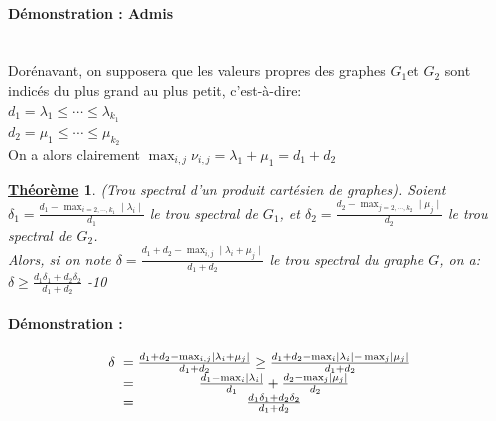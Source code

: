 \documentclass[12pt,openany]{report}
\newtheorem{theorem}{\underline{Théorème}}
\begin{document}
\paragraph{Démonstration : Admis }\cite{Ghazal}\\
Dorénavant, on supposera que les valeurs propres des graphes $\mathit{G}_1  $et $\mathit{G}_2  $ sont indicés du plus grand au plus petit, c'est-à-dire:\\
$d_1=\lambda_1 \leq \cdots \leq \lambda_{k_1} $\\
$d_2=\mu_1 \leq \cdots \leq \mu_{k_2}   $\\
On a alors clairement $ \max_{i,j}\nu_{i,j}=\lambda_1 + \mu_1=d_1+d_2  $
\begin{theorem} (Trou spectral d’un produit cartésien de graphes). Soient $\delta_1=\frac{d_{1}-\max_{i=2,\cdots, k_1}\mid \lambda_i \mid}{d_1}$ le trou spectral de $ \mathit{G}_1 $, et $\delta_2 =\frac{d_{2}-\max_{j=2,\cdots, k_2}\mid \mu_j \mid}{d_2} $ le trou spectral de $ \mathit{G}_2$.\\
Alors, si on note $ \delta =\frac{d_{1}+d_{2}-\max_{i,j}\mid \lambda_i + \mu_j \mid}{d_1 + d_2} $ \hspace{0.2cm} le trou spectral du graphe $\mathit{G} $, on a:\\
$ \delta \geq \frac{d_1 \delta_1 + d_2 \delta_2}{d_1 + d_2} $ \cite{Ghazal}-10

\end{theorem}
\paragraph{Démonstration :}
\begin{center}


\[
\left.
\begin{array}{c@{\hspace{0.2cm}=\hspace{0.1cm}} c c}

\delta & \frac{d_1 + d_2 -\max_{i,j}\mid \lambda_i + \mu_j \mid}{d_1+d_2} \geq \frac{d_1 + d_2 -\max_{i}\mid \lambda_i \mid-\max_{j}\mid \mu_j \mid}{d_1+d_2} \\

&\frac{d_1 -\max_{i}\mid \lambda_i \mid}{d_1}+ \frac{d_2 -\max_{j}\mid \mu_j \mid}{d_2}  \\
& \frac{d_1\delta_1 + d_2 \delta_2}{d_1 +d_2}


\end{array}
\right.
\]

\end{center}
\end{document}
